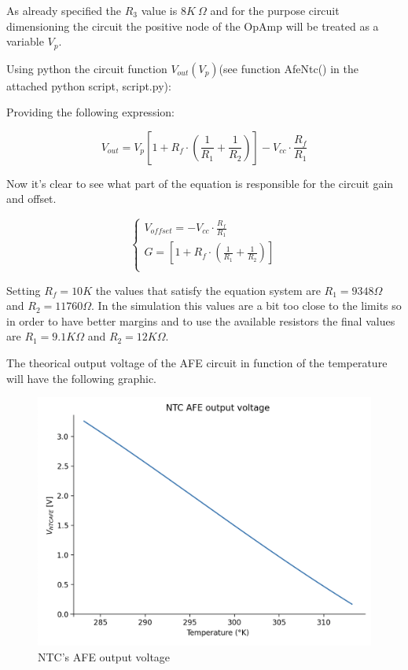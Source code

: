 \documentclass[12pt]{article}
\begin{document}
    As already specified the $R_3$ value is $8K~\Omega$ and for the purpose circuit dimensioning the circuit 
    the positive node of the OpAmp will be treated as a variable $V_p$.

    Using python the circuit function $V_{out}(V_p)$(see function AfeNtc() in the attached python script, script.py): 

       
    Providing the following expression:

    \begin{equation}
        V_{out} = V_p\left[ 1 + R_f\cdot\left(\frac{1}{R_1} + \frac{1}{R_2}\right) \right] - V_{cc}\cdot\frac{R_f}{R_1}
    \end{equation}

    Now it's clear to see what part of the equation is responsible for the circuit gain and offset.
    
    \begin{equation}
        \begin{cases}
            V_{offset} = - V_{cc}\cdot\frac{R_f}{R_1}\\
            G = \left[ 1 + R_f\cdot\left(\frac{1}{R_1} + \frac{1}{R_2}\right) \right]\\
        \end{cases}
    \end{equation}

    Setting $R_f = 10K$ the values that satisfy the equation system are $R_1 = 9348 \Omega$ and $R_2 = 11760 \Omega$.
    In the simulation this values are a bit too close to the limits so in order to have better margins and to use the available resistors
    the final values are  $R_1 = 9.1K \Omega$ and $R_2 = 12K \Omega$.

    The theorical output voltage of the AFE circuit in function of the temperature will have the
    following graphic.
    \begin{figure}[H] 
        \centering
        \includegraphics*[scale = 0.6]{images/outuptafentc.png}
        \caption{NTC's AFE output voltage}
        \label{wrap-fig:1}
    \end{figure}
\end{document}

